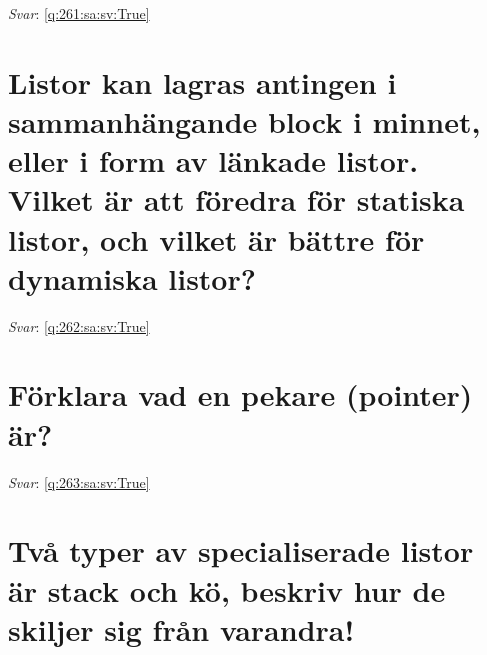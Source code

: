 \documentclass[a4paper,11pt,oneside]{book}
\begin{document}
\begin{sloppypar}
\label{q:261:sa:sv:False}

\vspace{2cm}

\noindent\makebox[\textwidth]{\hrulefill}

\vspace{1cm}

\textit{Svar}: \autoref{q:261:sa:sv:True}



\section{Listor kan lagras antingen i sammanh\"angande block i minnet, eller i form av l\"ankade listor. Vilket \"ar att f\"oredra f\"or statiska listor, och vilket \"ar b\"attre f\"or dynamiska listor?}

\label{q:262:sa:sv:False}

\vspace{2cm}

\noindent\makebox[\textwidth]{\hrulefill}

\vspace{1cm}

\textit{Svar}: \autoref{q:262:sa:sv:True}



\section{F\"orklara vad en pekare (pointer) \"ar?}

\label{q:263:sa:sv:False}

\vspace{2cm}

\noindent\makebox[\textwidth]{\hrulefill}

\vspace{1cm}

\textit{Svar}: \autoref{q:263:sa:sv:True}



\section{Tv\r{a} typer av specialiserade listor \"ar stack och k\"o, beskriv hur de skiljer sig fr\r{a}n varandra!}

\label{q:264:sa:sv:False}

\vspace{2cm}

\noindent\makebox[\textwidth]{\hrulefill}


\end{sloppypar}
\end{document}
